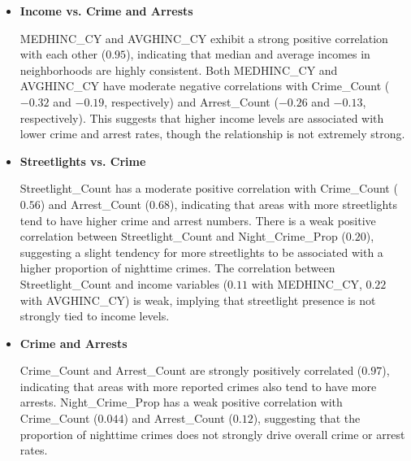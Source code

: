 \documentclass{report}
\begin{document}
\begin{itemize}
\item \textbf{Income vs. Crime and Arrests}
  \par MEDHINC\_CY and AVGHINC\_CY exhibit a strong positive correlation with each other ($0.95$), indicating that median and average incomes in neighborhoods are highly consistent. Both MEDHINC\_CY and AVGHINC\_CY have moderate negative correlations with Crime\_Count ($-0.32$ and $-0.19$, respectively) and Arrest\_Count ($-0.26$ and $-0.13$, respectively). This suggests that higher income levels are associated with lower crime and arrest rates, though the relationship is not extremely strong.
\item \textbf{Streetlights vs. Crime}
  \par Streetlight\_Count has a moderate positive correlation with Crime\_Count ($0.56$) and Arrest\_Count ($0.68$), indicating that areas with more streetlights tend to have higher crime and arrest numbers. There is a weak positive correlation between Streetlight\_Count and Night\_Crime\_Prop ($0.20$), suggesting a slight tendency for more streetlights to be associated with a higher proportion of nighttime crimes. The correlation between Streetlight\_Count and income variables ($0.11$ with MEDHINC\_CY, $0.22$ with AVGHINC\_CY) is weak, implying that streetlight presence is not strongly tied to income levels.
\item \textbf{Crime and Arrests}
  \par Crime\_Count and Arrest\_Count are strongly positively correlated ($0.97$), indicating that areas with more reported crimes also tend to have more arrests. Night\_Crime\_Prop has a weak positive correlation with Crime\_Count ($0.044$) and Arrest\_Count ($0.12$), suggesting that the proportion of nighttime crimes does not strongly drive overall crime or arrest rates.
\end{itemize}
\end{document}
